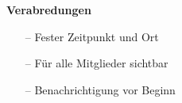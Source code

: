 \documentclass[aspectratio=1610]{beamer}
\begin{document}
	\begin{frame}
		\begin{minipage}{0.5\textwidth}
			\setlength{\fboxsep}{0pt}%
			\setlength{\fboxrule}{1pt}%
			\captionsetup{labelformat=empty}
			\centering
		\end{minipage}%
		\begin{minipage}{0.5\textwidth}
			\textbf{Verabredungen}
			\begin{itemize}
				\item[--] Fester Zeitpunkt und Ort
				\item[--] Für alle Mitglieder sichtbar
				\item[--] Benachrichtigung vor Beginn
			\end{itemize}
		\end{minipage}
	\end{frame}
\end{document}
